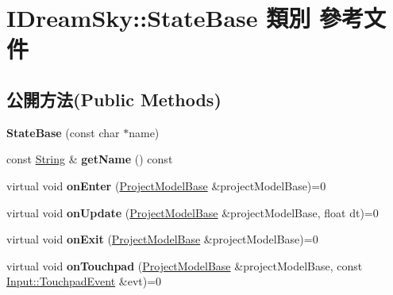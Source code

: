 \hypertarget{class_i_dream_sky_1_1_state_base}{}\section{I\+Dream\+Sky\+:\+:State\+Base 類別 參考文件}
\label{class_i_dream_sky_1_1_state_base}
\subsection*{公開方法(Public Methods)}
\begin{DoxyCompactItemize}
\item 
{\bfseries State\+Base} (const char $\ast$name)\hypertarget{class_i_dream_sky_1_1_state_base_ae738d96396b509f184553edb5875f4a4}{}\label{class_i_dream_sky_1_1_state_base_ae738d96396b509f184553edb5875f4a4}

\item 
const \hyperlink{class_i_dream_sky_1_1_string}{String} \& {\bfseries get\+Name} () const \hypertarget{class_i_dream_sky_1_1_state_base_a0f2a5495baf9b0622c9f46e0f0b53d75}{}\label{class_i_dream_sky_1_1_state_base_a0f2a5495baf9b0622c9f46e0f0b53d75}

\item 
virtual void {\bfseries on\+Enter} (\hyperlink{class_i_dream_sky_1_1_project_model_base}{Project\+Model\+Base} \&project\+Model\+Base)=0\hypertarget{class_i_dream_sky_1_1_state_base_aa92933b5d1810f51c2c1b562d924a6e1}{}\label{class_i_dream_sky_1_1_state_base_aa92933b5d1810f51c2c1b562d924a6e1}

\item 
virtual void {\bfseries on\+Update} (\hyperlink{class_i_dream_sky_1_1_project_model_base}{Project\+Model\+Base} \&project\+Model\+Base, float dt)=0\hypertarget{class_i_dream_sky_1_1_state_base_a0dde56879f17b266a4d4c2bdc4e0c4a6}{}\label{class_i_dream_sky_1_1_state_base_a0dde56879f17b266a4d4c2bdc4e0c4a6}

\item 
virtual void {\bfseries on\+Exit} (\hyperlink{class_i_dream_sky_1_1_project_model_base}{Project\+Model\+Base} \&project\+Model\+Base)=0\hypertarget{class_i_dream_sky_1_1_state_base_a6a39441cd3d1270d5d5e8e50d2683404}{}\label{class_i_dream_sky_1_1_state_base_a6a39441cd3d1270d5d5e8e50d2683404}

\item 
virtual void {\bfseries on\+Touchpad} (\hyperlink{class_i_dream_sky_1_1_project_model_base}{Project\+Model\+Base} \&project\+Model\+Base, const \hyperlink{class_i_dream_sky_1_1_input_1_1_touchpad_event}{Input\+::\+Touchpad\+Event} \&evt)=0\hypertarget{class_i_dream_sky_1_1_state_base_aa34bff7580df32082231b35abb2b5961}{}\label{class_i_dream_sky_1_1_state_base_aa34bff7580df32082231b35abb2b5961}


\end{DoxyCompactItemize}
